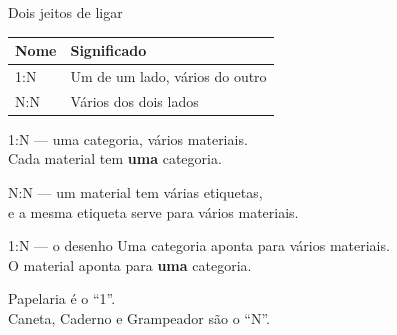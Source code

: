 \documentclass[aspectratio=169,11pt]{beamer}
\begin{document}
\begin{frame}{Dois jeitos de ligar}
  \begin{center}
  \begin{tabular}{ll}
    \toprule
    Nome & Significado \\
    \midrule
    1:N & Um de um lado, vários do outro \\
    N:N & Vários dos dois lados \\
    \bottomrule
  \end{tabular}
  \end{center}

  \vspace{0.7em}
  1:N --- uma categoria, vários materiais.\\
  Cada material tem \textbf{uma} categoria.

  \vspace{0.5em}
  N:N --- um material tem várias etiquetas,\\
  e a mesma etiqueta serve para vários materiais.
\end{frame}

\begin{frame}{1{:}N --- o desenho}
  Uma categoria aponta para vários materiais.\\
  O material aponta para \textbf{uma} categoria.

  \vspace{0.6em}
  \begin{center}
  \end{center}

  \vspace{0.3em}
  Papelaria é o ``1''.\\
  Caneta, Caderno e Grampeador são o ``N''.
\end{frame}
\end{document}
